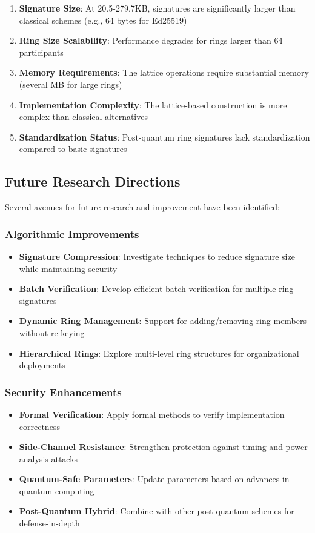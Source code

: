 \documentclass[11pt,a4paper]{article}
\begin{document}
\begin{enumerate}
\item \textbf{Signature Size}: At 20.5-279.7KB, signatures are significantly larger than classical schemes (e.g., 64 bytes for Ed25519)
\item \textbf{Ring Size Scalability}: Performance degrades for rings larger than 64 participants
\item \textbf{Memory Requirements}: The lattice operations require substantial memory (several MB for large rings)
\item \textbf{Implementation Complexity}: The lattice-based construction is more complex than classical alternatives
\item \textbf{Standardization Status}: Post-quantum ring signatures lack standardization compared to basic signatures
\end{enumerate}

\subsection{Future Research Directions}

Several avenues for future research and improvement have been identified:

\subsubsection{Algorithmic Improvements}

\begin{itemize}
\item \textbf{Signature Compression}: Investigate techniques to reduce signature size while maintaining security
\item \textbf{Batch Verification}: Develop efficient batch verification for multiple ring signatures
\item \textbf{Dynamic Ring Management}: Support for adding/removing ring members without re-keying
\item \textbf{Hierarchical Rings}: Explore multi-level ring structures for organizational deployments
\end{itemize}

\subsubsection{Security Enhancements}

\begin{itemize}
\item \textbf{Formal Verification}: Apply formal methods to verify implementation correctness
\item \textbf{Side-Channel Resistance}: Strengthen protection against timing and power analysis attacks
\item \textbf{Quantum-Safe Parameters}: Update parameters based on advances in quantum computing
\item \textbf{Post-Quantum Hybrid}: Combine with other post-quantum schemes for defense-in-depth
\end{itemize}
\end{document}
